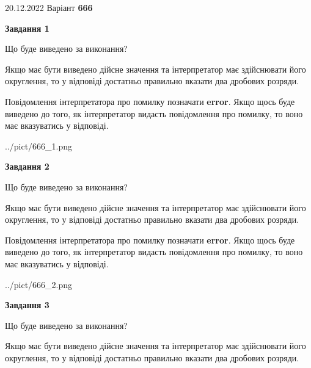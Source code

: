 \documentclass[12pt, ukrainian]{article}
\begin{document}
{20.12.2022 Варіант \No \textbf { 666 }\par}
{
\begin {Large}

{\begin {center}\textbf{Завдання 1}\end {center}}\par
Що буде виведено за виконання? \par

Якщо має бути виведено дійсне значення та інтерпретатор має здійснювати його округлення, 
то у відповіді достатньо правильно вказати два дробових розряди.

Повідомлення інтерпретатора про помилку позначати \textbf{error}.
Якщо щось буде виведено до того, як інтерпретатор видасть повідомлення про помилку, 
то воно має вказуватись у відповіді. \par

\begin{center}
	{../pict/666_1.png}
\end{center}
\newpage

{\begin {center}\textbf{Завдання 2}\end {center}}\par
Що буде виведено за виконання? \par

Якщо має бути виведено дійсне значення та інтерпретатор має здійснювати його округлення, 
то у відповіді достатньо правильно вказати два дробових розряди.

Повідомлення інтерпретатора про помилку позначати \textbf{error}.
Якщо щось буде виведено до того, як інтерпретатор видасть повідомлення про помилку, 
то воно має вказуватись у відповіді. \par

\begin{center}
	{../pict/666_2.png}
\end{center}
\newpage

{\begin {center}\textbf{Завдання 3}\end {center}}\par
Що буде виведено за виконання? \par

Якщо має бути виведено дійсне значення та інтерпретатор має здійснювати його округлення, 
то у відповіді достатньо правильно вказати два дробових розряди.


\end{Large}}
\end{document}
